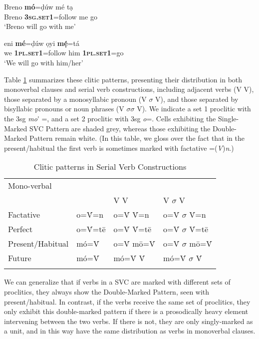 \documentclass[output=paper]{langsci/langscibook}
\begin{document}
\ea\label{ex:rolle:18}
\gll   Breno  \textbf{mó}=ḍúw       mé   tạ\\ 
       Breno   \textbf{\textsc{3sg.set1}}=follow    me  go\\
\glt ‘Breno will go with me’
\z

\ea\label{ex:rolle:19}
\gll   eni   \textbf{mé}=ḍúw     ọyi    \textbf{mẹ́}=tá\\ 
       we   \textbf{\textsc{1pl.set1}}=follow  him    \textbf{\textsc{1pl.set1}}=go\\
\glt ‘We will go with him/her’
\z

Table \ref{table:3} summarizes these clitic patterns, presenting their distribution in both monoverbal clauses and serial verb constructions, including adjacent verbs (V V), those separated by a monosyllabic pronoun (V $\sigma $ V), and those separated by bisyllabic pronouns or noun phrases (V $\sigma \sigma $ V). We indicate a set 1 proclitic with the 3sg \textit{mo}\'{} =, and a set 2 proclitic with 3sg \textit{o}=. Cells exhibiting the Single-Marked SVC Pattern are shaded grey, whereas those exhibiting the Double-Marked Pattern remain white. (In this table, we gloss over the fact that in the present/habitual the first verb is sometimes marked with factative =(\textit{V})\textit{n}.)

\begin{table}

\begin{tabularx}{\textwidth}{XXXXX}
\lsptoprule
\hhline{----~}  {Mono-}{verbal} \multicolumn{2}{X}{{Serial verb construction}} & \\
  & & {V V} & \multicolumn{2}{X}{{V $\sigma $ V}}\\
{Factative} & {o=\'{V}=n} & {o=\'{V} \'{V}=n} & \multicolumn{2}{X}{{o=\'{V} $\sigma $ \'{V}=n}}\\
{Perfect} & {o=\'{V}=tē} & {o=\'{V} \'{V}=tē} & \multicolumn{2}{X}{{o=\'{V} $\sigma $ \'{V}=tē}}\\
{Present/Habitual} & {mó=\'{V}} & {o=\'{V} mō=\'{V}} & \multicolumn{2}{X}{{o=\'{V} $\sigma $ mō=\'{V}}}\\
{Future} & {mó=\'{V}} & {mó=\'{V} \'{V}} & \multicolumn{2}{X}{{mó=\'{V} $\sigma $ \'{V}}}\\
\lspbottomrule
\end{tabularx}
\label{table:3}
\caption{Clitic patterns in Serial Verb Constructions}
\end{table}



We can generalize that if verbs in a SVC are marked with different sets of proclitics, they always show the Double-Marked Pattern, seen with present/habitual. In contrast, if the verbs receive the same set of proclitics, they only exhibit this double-marked pattern if there is a prosodically heavy element intervening between the two verbs. If there is not, they are only singly-marked as a unit, and in this way have the same distribution as verbs in monoverbal clauses. 
\end{document}
